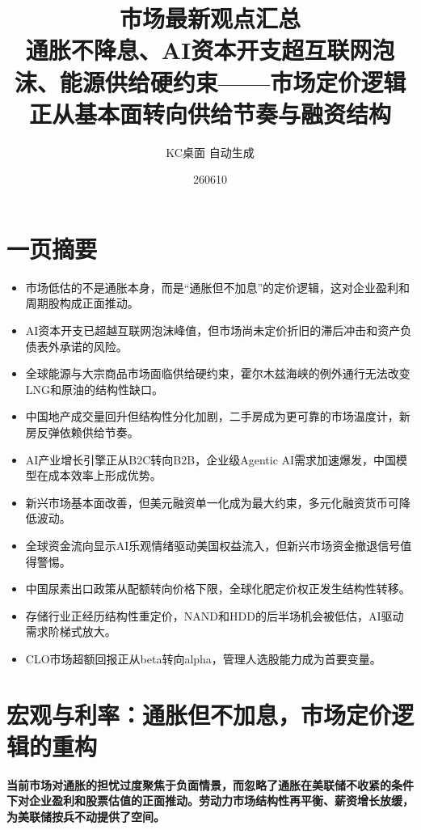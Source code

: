 \documentclass[11pt]{ctexart}
\title{\textbf{市场最新观点汇总}\\[0.4em]{\large 通胀不降息、AI资本开支超互联网泡沫、能源供给硬约束——市场定价逻辑正从基本面转向供给节奏与融资结构}}
\author{KC桌面 自动生成}
\date{260610}
\begin{document}
\maketitle
\tableofcontents
\newpage
\section{一页摘要}
\begin{itemize}
  \item 市场低估的不是通胀本身，而是“通胀但不加息”的定价逻辑，这对企业盈利和周期股构成正面推动。
  \item AI资本开支已超越互联网泡沫峰值，但市场尚未定价折旧的滞后冲击和资产负债表外承诺的风险。
  \item 全球能源与大宗商品市场面临供给硬约束，霍尔木兹海峡的例外通行无法改变LNG和原油的结构性缺口。
  \item 中国地产成交量回升但结构性分化加剧，二手房成为更可靠的市场温度计，新房反弹依赖供给节奏。
  \item AI产业增长引擎正从B2C转向B2B，企业级Agentic AI需求加速爆发，中国模型在成本效率上形成优势。
  \item 新兴市场基本面改善，但美元融资单一化成为最大约束，多元化融资货币可降低波动。
  \item 全球资金流向显示AI乐观情绪驱动美国权益流入，但新兴市场资金撤退信号值得警惕。
  \item 中国尿素出口政策从配额转向价格下限，全球化肥定价权正发生结构性转移。
  \item 存储行业正经历结构性重定价，NAND和HDD的后半场机会被低估，AI驱动需求阶梯式放大。
  \item CLO市场超额回报正从beta转向alpha，管理人选股能力成为首要变量。
\end{itemize}
\section{宏观与利率：通胀但不加息，市场定价逻辑的重构}
\textbf{当前市场对通胀的担忧过度聚焦于负面情景，而忽略了通胀在美联储不收紧的条件下对企业盈利和股票估值的正面推动。劳动力市场结构性再平衡、薪资增长放缓，为美联储按兵不动提供了空间。}
\end{document}
